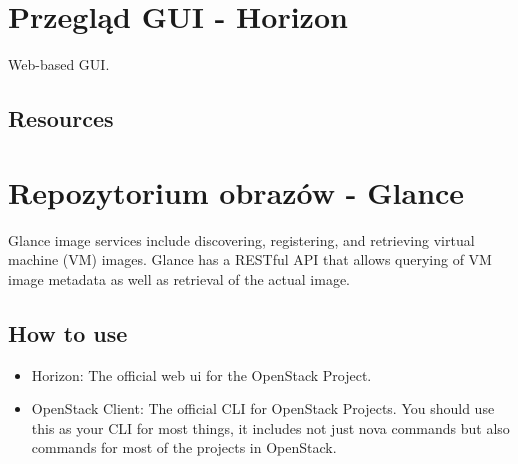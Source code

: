 \documentclass[letterpaper,10pt,english]{sphinxmanual}
\begin{document}
\section{Przegląd GUI - Horizon}
\label{\detokenize{basics/README:przeglad-gui-horizon}}
Web-based GUI.



\subsection{Resources}
\label{\detokenize{basics/README:resources}}


\section{Repozytorium obrazów - Glance}
\label{\detokenize{basics/README:repozytorium-obrazow-glance}}
Glance image services include discovering, registering, and retrieving virtual machine (VM) images. Glance has a RESTful API that allows querying of VM image metadata as well as retrieval of the actual image.


\subsection{How to use}
\label{\detokenize{basics/README:how-to-use}}\begin{itemize}
\item {} 
Horizon: The official web ui for the OpenStack Project.

\item {} 
OpenStack Client: The official CLI for OpenStack Projects. You should use this as your CLI for most things, it includes not just nova commands but also commands for most of the projects in OpenStack.

\end{itemize}
\end{document}
